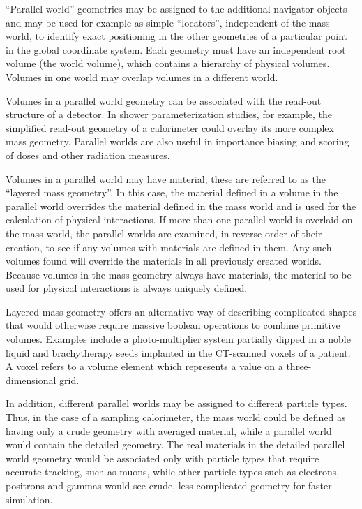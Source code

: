 ``Parallel world'' geometries may be assigned to the additional navigator objects
and may be used for example as simple ``locators'', independent of the mass 
world, to identify exact positioning in the other geometries of a particular 
point in the global coordinate system.  Each geometry must have an
independent root volume (the world volume), which contains a hierarchy of 
physical volumes.  Volumes in one world may overlap volumes in a different 
world. 

Volumes in a parallel world geometry can be associated with the read-out 
structure of a detector.  In shower parameterization studies, for example, the
simplified read-out geometry of a calorimeter could overlay its more complex
mass geometry.  Parallel worlds are also useful in importance biasing and
scoring of doses and other radiation measures.

Volumes in a parallel world may have material; these are referred to as the
``layered mass geometry''.  In this case, the material defined in a volume in
the parallel world overrides the material defined in the mass world and is 
used for the calculation of physical interactions.  If more than one parallel 
world is overlaid on the mass world, the parallel worlds are examined, in 
reverse order of their creation, to see if any volumes with materials are 
defined in them.  Any such volumes found will override the materials in all 
previously created worlds.  Because volumes in the mass geometry always have 
materials, the material to be used for physical interactions is always 
uniquely defined.

Layered mass geometry offers an alternative way of describing complicated 
shapes that would otherwise require massive boolean operations to combine 
primitive volumes.  Examples include a photo-multiplier system partially 
dipped in a noble liquid and brachytherapy seeds implanted in the CT-scanned 
voxels of a patient.  A voxel refers to a volume element which represents a 
value on a three-dimensional grid.

In addition, different parallel worlds may be assigned to different particle 
types.  Thus, in the case of a sampling calorimeter, the mass world could 
be defined as having only a crude geometry with averaged material, while a 
parallel world would contain the detailed geometry.  The real materials in the
detailed parallel world geometry would be associated only with particle types 
that require accurate tracking, such as muons, while other particle types such
as electrons, positrons and gammas would see crude, less complicated geometry 
for faster simulation.

